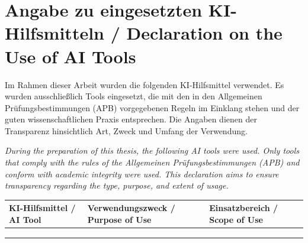 \section*{Angabe zu eingesetzten KI-Hilfsmitteln / Declaration on the Use of AI Tools}
Im Rahmen dieser Arbeit wurden die folgenden KI-Hilfsmittel verwendet. 
Es wurden ausschließlich Tools eingesetzt, die mit den in den Allgemeinen Prüfungsbestimmungen (APB) vorgegebenen Regeln im Einklang stehen und der guten wissenschaftlichen Praxis entsprechen. Die Angaben dienen der Transparenz hinsichtlich Art, Zweck und Umfang der Verwendung.

\medskip

\noindent
\textit{During the preparation of this thesis, the following AI tools were used. Only tools that comply with the rules of the Allgemeinen Prüfungsbestimmungen (APB) and conform with academic integrity were used. This declaration aims to ensure transparency regarding the type, purpose, and extent of usage.}

\medskip
\vspace{0.5cm}
\begin{tabularx}{\textwidth}{|X|X|X|}
\hline
\textbf{KI-Hilfsmittel / AI Tool} & \textbf{Verwendungszweck / Purpose of Use} & \textbf{Einsatzbereich / Scope of Use} \\
\hline
 &  &  \\
\hline
 &  &  \\
\hline
 &  &  \\
\hline
\end{tabularx}
